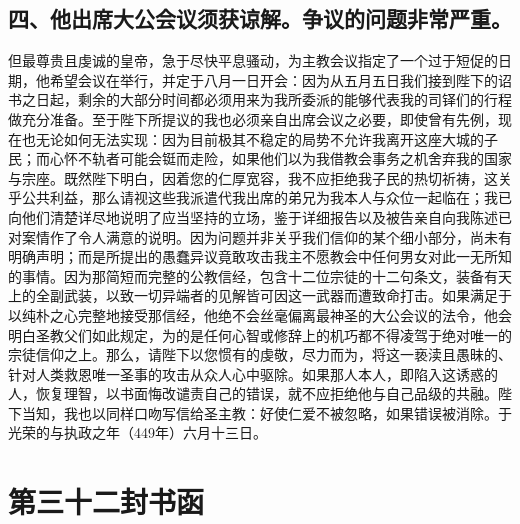 
\subsection{四、他出席大公会议须获谅解。争议的问题非常严重。}

但最尊贵且虔诚的皇帝，急于尽快平息骚动，为主教会议指定了一个过于短促的日期，他希望会议在举行，并定于八月一日开会：因为从五月五日我们接到陛下的诏书之日起，剩余的大部分时间都必须用来为我所委派的能够代表我的司铎们的行程做充分准备。至于陛下所提议的我也必须亲自出席会议之必要，即使曾有先例，现在也无论如何无法实现：因为目前极其不稳定的局势不允许我离开这座大城的子民；而心怀不轨者可能会铤而走险，如果他们以为我借教会事务之机舍弃我的国家与宗座。既然陛下明白，因着您的仁厚宽容，我不应拒绝我子民的热切祈祷，这关乎公共利益，那么请视这些我派遣代我出席的弟兄为我本人与众位一起临在；我已向他们清楚详尽地说明了应当坚持的立场，鉴于详细报告以及被告亲自向我陈述已对案情作了令人满意的说明。因为问题并非关乎我们信仰的某个细小部分，尚未有明确声明；而是所提出的愚蠢异议竟敢攻击我主不愿教会中任何男女对此一无所知的事情。因为那简短而完整的公教信经，包含十二位宗徒的十二句条文，装备有天上的全副武装，以致一切异端者的见解皆可因这一武器而遭致命打击。如果满足于以纯朴之心完整地接受那信经，他绝不会丝毫偏离最神圣的大公会议的法令，他会明白圣教父们如此规定，为的是任何心智或修辞上的机巧都不得凌驾于绝对唯一的宗徒信仰之上。那么，请陛下以您惯有的虔敬，尽力而为，将这一亵渎且愚昧的、针对人类救恩唯一圣事的攻击从众人心中驱除。如果那人本人，即陷入这诱惑的人，恢复理智，以书面悔改谴责自己的错误，就不应拒绝他与自己品级的共融。陛下当知，我也以同样口吻写信给圣主教：好使仁爱不被忽略，如果错误被消除。于光荣的与执政之年（449年）六月十三日。\par



\section{第三十二封书函}

